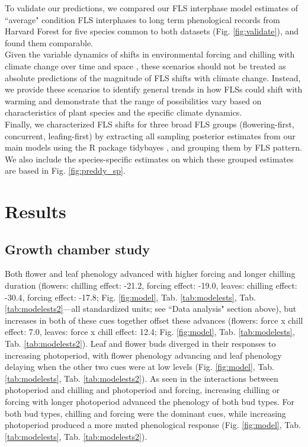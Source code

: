 \documentclass[11pt]{article}\usepackage[]{graphicx}\usepackage[]{color}
\begin{document}
\noindent To validate our predictions, we compared our FLS interphase model estimates of ``average" condition FLS interphases to long term phenological records from Harvard Forest \citep{OKeefe2015} for five species common to both datasets (Fig. \ref{fig:validate}), and found them comparable. \\

\noindent Given the variable dynamics of shifts in environmental forcing and chilling with climate change over time and space \citep{Luedeling:2011aa}, these scenarios should not be treated as absolute predictions of the magnitude of FLS shifts with climate change. Instead, we provide these scenarios to identify general trends in how FLSs could shift with warming and demonstrate that the range of possibilities vary based on characteristics of plant species and the specific climate dynamics.\\

\noindent Finally, we characterized FLS shifts for three broad FLS groups (flowering-first, concurrent, leafing-first) by extracting all sampling posterior estimates from our main models using the R package tidybayes \citep{Kay2020}, and grouping them by FLS pattern. We also include the species-specific estimates on which these grouped estimates are based in Fig. \ref{fig:preddy_sp}.  \\ 

\section*{Results} 
\subsection*{Growth chamber study} 
\noindent  Both flower and leaf phenology advanced with higher forcing and longer chilling duration (flowers: chilling effect: -21.2, forcing effect: -19.0, leaves: chilling effect: -30.4, forcing effect: -17.8; Fig. \ref{fig:model}, Tab. \ref{tab:modelests}, Tab. \ref{tab:modelests2}---all standardized units; see ``Data analysis" section above), but increases in both of these cues together offset these advances (flowers: force x chill effect: 7.0, leaves: force x chill effect: 12.4; Fig. \ref{fig:model}, Tab. \ref{tab:modelests}, Tab. \ref{tab:modelests2}). Leaf and flower buds diverged in their responses to increasing photoperiod, with flower phenology advancing and leaf phenology  delaying when the other two cues were at low levels (Fig. \ref{fig:model}, Tab. \ref{tab:modelests}, Tab. \ref{tab:modelests2}). As seen in the interactions between photoperiod and chilling and photoperiod and forcing, increasing chilling or forcing with longer photoperiod advanced the phenology of both bud types. For both bud types, chilling and forcing were the dominant cues, while increasing photoperiod produced a more muted phenological response (Fig. \ref{fig:model}, Tab. \ref{tab:modelests}, Tab. \ref{tab:modelests2}). \\
\end{document}
